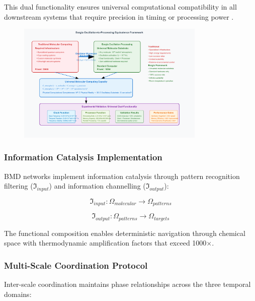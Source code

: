 \documentclass[12pt,a4paper]{article}
\begin{document}
This dual functionality ensures universal computational compatibility in all downstream systems that require precision in timing or processing power \cite{sterling2015principles}.


\begin{figure}[H]
    \centering
    \includegraphics[width=0.8\textwidth]{images/borgia-oscillation-processing.pdf}
    \caption{}
    \label{fig:universal_computing}
    \end{figure}

\subsubsection{Information Catalysis Implementation}

BMD networks implement information catalysis through pattern recognition filtering ($\mathfrak{I}_{input}$) and information channelling ($\mathfrak{I}_{output}$):

\begin{equation}
\mathfrak{I}_{input}: \Omega_{molecular} \rightarrow \Omega_{patterns}
\end{equation}

\begin{equation}
\mathfrak{I}_{output}: \Omega_{patterns} \rightarrow \Omega_{targets}
\end{equation}

The functional composition enables deterministic navigation through chemical space with thermodynamic amplification factors that exceed 1000×.

\subsubsection{Multi-Scale Coordination Protocol}

Inter-scale coordination maintains phase relationships across the three temporal domains:
\end{document}
